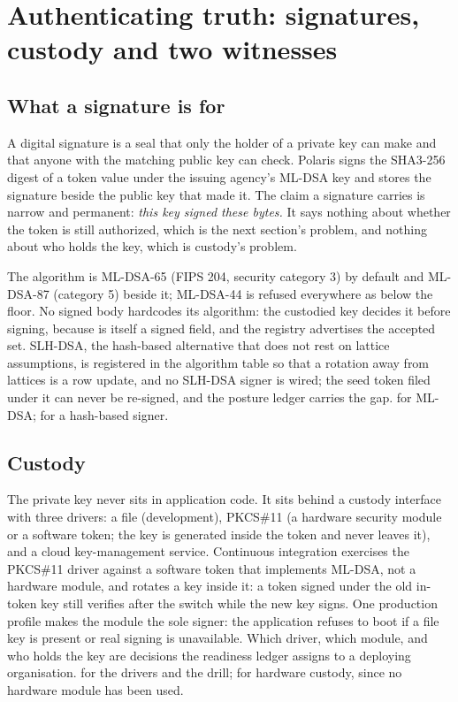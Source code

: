 \section{Authenticating truth: signatures, custody and two witnesses}
\label{sec:signatures}

\subsection{What a signature is for}

A digital signature is a seal that only the holder of a private key can make and that anyone with
the matching public key can check. Polaris signs the SHA3-256 digest of a token value under the
issuing agency's ML-DSA key and stores the signature beside the public key that made it. The claim
a signature carries is narrow and permanent: \emph{this key signed these bytes.} It says nothing
about whether the token is still authorized, which is the next section's problem, and nothing about
who holds the key, which is custody's problem. \sImpl

The algorithm is ML-DSA-65 (FIPS 204, security category 3) by default and ML-DSA-87 (category 5)
beside it; ML-DSA-44 is refused everywhere as below the floor. No signed body hardcodes its
algorithm: the custodied key decides it before signing, because  is itself a signed
field, and the registry advertises the accepted set. SLH-DSA, the hash-based alternative that does
not rest on lattice assumptions, is registered in the algorithm table so that a rotation away from
lattices is a row update, and no SLH-DSA signer is wired; the seed token filed under it can never
be re-signed, and the posture ledger carries the gap. \sImpl{} for ML-DSA; \sFut{} for a hash-based
signer.

\subsection{Custody}

The private key never sits in application code. It sits behind a custody interface with three
drivers: a file (development), PKCS\#11 (a hardware security module or a software token; the key is
generated inside the token and never leaves it), and a cloud key-management service. Continuous
integration exercises the PKCS\#11 driver against a software token that implements ML-DSA, not a
hardware module, and rotates a key inside it: a token signed under the old in-token key still
verifies after the switch while the new key signs. One production profile makes the module the sole
signer: the application refuses to boot if a file key is present or real signing is unavailable.
Which driver, which module, and who holds the key are decisions the readiness ledger assigns to a
deploying organisation. \sImpl{} for the drivers and the drill; \sExt{} for hardware custody, since
no hardware module has been used.

